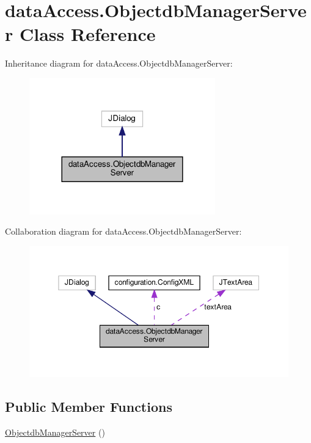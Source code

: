 \hypertarget{classdata_access_1_1_objectdb_manager_server}{}\section{data\+Access.\+Objectdb\+Manager\+Server Class Reference}
\label{classdata_access_1_1_objectdb_manager_server}


Inheritance diagram for data\+Access.\+Objectdb\+Manager\+Server\+:
\nopagebreak
\begin{figure}[H]
\begin{center}
\leavevmode
\includegraphics[width=228pt]{classdata_access_1_1_objectdb_manager_server__inherit__graph}
\end{center}
\end{figure}


Collaboration diagram for data\+Access.\+Objectdb\+Manager\+Server\+:
\nopagebreak
\begin{figure}[H]
\begin{center}
\leavevmode
\includegraphics[width=350pt]{classdata_access_1_1_objectdb_manager_server__coll__graph}
\end{center}
\end{figure}
\subsection*{Public Member Functions}
\begin{DoxyCompactItemize}
\item 
\mbox{\hyperlink{classdata_access_1_1_objectdb_manager_server_a6aac62b0bbbebbb54d3105d5820c0061}{Objectdb\+Manager\+Server}} ()
\end{DoxyCompactItemize}
